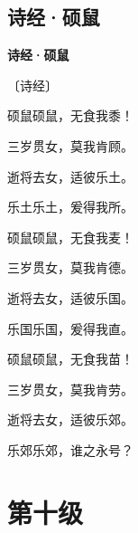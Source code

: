 \documentclass[12pt,UTF-8,openany,fontset=none]{ctexbook}
\begin{document}
\vspace{8pt}
\clearpage

\section{诗经·硕鼠}


\begin{center}
    {\bfseries 诗经·硕鼠}

    \vspace{18pt}

    \begin{large}\xuwen
        〔诗经〕
    \end{large}

\end{center}

    \vspace{18pt}  %

\begin{center}
    \begin{Large}

        硕鼠硕鼠，无食我黍！

        三岁贯女，莫我肯顾。

        逝将去女，适彼乐土。

        乐土乐土，爰得我所。

        \vspace{18pt}  %

        硕鼠硕鼠，无食我麦！

        三岁贯女，莫我肯德。

        逝将去女，适彼乐国。

        乐国乐国，爰得我直。

        \vspace{18pt}  %

        硕鼠硕鼠，无食我苗！

        三岁贯女，莫我肯劳。

        逝将去女，适彼乐郊。

        乐郊乐郊，谁之永号？

    \end{Large}

\end{center}

\vspace{8pt}
\clearpage

\chapter{第十级}
\clearpage
\end{document}
